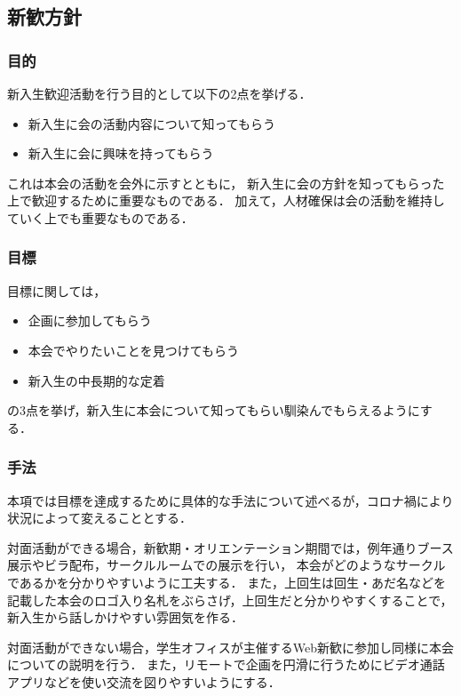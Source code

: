 \subsection*{新歓方針}


\subsubsection*{目的}
新入生歓迎活動を行う目的として以下の2点を挙げる．
\begin{itemize}
\item 新入生に会の活動内容について知ってもらう
\item 新入生に会に興味を持ってもらう
\end{itemize}
これは本会の活動を会外に示すとともに，
新入生に会の方針を知ってもらった上で歓迎するために重要なものである．
加えて，人材確保は会の活動を維持していく上でも重要なものである．

\subsubsection*{目標}
目標に関しては，
\begin{itemize}
\item 企画に参加してもらう
\item 本会でやりたいことを見つけてもらう
\item 新入生の中長期的な定着
\end{itemize}
の3点を挙げ，新入生に本会について知ってもらい馴染んでもらえるようにする．

\subsubsection*{手法}
本項では目標を達成するために具体的な手法について述べるが，コロナ禍により状況によって変えることとする．

対面活動ができる場合，新歓期・オリエンテーション期間では，例年通りブース展示やビラ配布，サークルルームでの展示を行い，
本会がどのようなサークルであるかを分かりやすいように工夫する．
また，上回生は回生・あだ名などを記載した本会のロゴ入り名札をぶらさげ，上回生だと分かりやすくすることで，
新入生から話しかけやすい雰囲気を作る．

対面活動ができない場合，学生オフィスが主催するWeb新歓に参加し同様に本会についての説明を行う．
また，リモートで企画を円滑に行うためにビデオ通話アプリなどを使い交流を図りやすいようにする．

